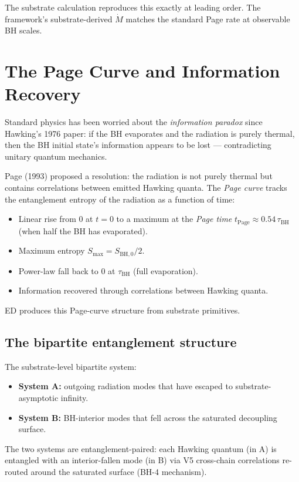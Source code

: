 \documentclass[11pt,a4paper]{article}
\begin{document}
The substrate calculation reproduces this exactly at leading order. The framework's substrate-derived $\dot M$ matches the standard Page rate at observable BH scales.

\section{The Page Curve and Information Recovery}

Standard physics has been worried about the \emph{information paradox} since Hawking's 1976 paper: if the BH evaporates and the radiation is purely thermal, then the BH initial state's information appears to be lost --- contradicting unitary quantum mechanics.

Page (1993) proposed a resolution: the radiation is not purely thermal but contains correlations between emitted Hawking quanta. The \emph{Page curve} tracks the entanglement entropy of the radiation as a function of time:

\begin{itemize}[noitemsep]
  \item Linear rise from 0 at $t = 0$ to a maximum at the \emph{Page time} $t_{\mathrm{Page}} \approx 0.54\, \tau_{\mathrm{BH}}$ (when half the BH has evaporated).
  \item Maximum entropy $S_{\max} = S_{\mathrm{BH},0}/2$.
  \item Power-law fall back to 0 at $\tau_{\mathrm{BH}}$ (full evaporation).
  \item Information recovered through correlations between Hawking quanta.
\end{itemize}

ED produces this Page-curve structure from substrate primitives.

\subsection{The bipartite entanglement structure}

The substrate-level bipartite system:
\begin{itemize}[noitemsep]
  \item \textbf{System A:} outgoing radiation modes that have escaped to substrate-asymptotic infinity.
  \item \textbf{System B:} BH-interior modes that fell across the saturated decoupling surface.
\end{itemize}

The two systems are entanglement-paired: each Hawking quantum (in A) is entangled with an interior-fallen mode (in B) via V5 cross-chain correlations re-routed around the saturated surface (BH-4 mechanism).
\end{document}
